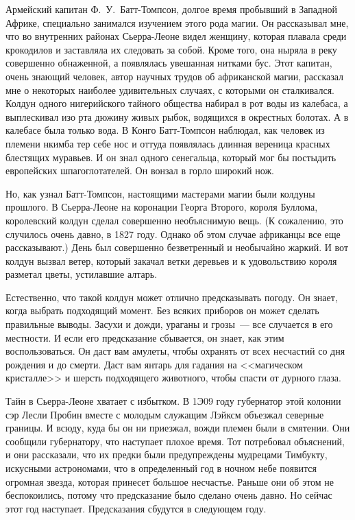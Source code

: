 \documentclass[12pt,a4paper,twoside,openany,svgnames]{memoir}
\begin{document}
Армейский капитан Ф.~У.~Батт-Томпсон, долгое время пробывший в Западной Африке, специально занимался изучением этого рода магии. Он рассказывал мне, что во внутренних районах Сьерра-Леоне видел женщину, которая плавала среди крокодилов и заставляла их следовать за собой. Кроме того, она ныряла в реку совершенно обнаженной, а появлялась увешанная нитками бус. Этот капитан, очень знающий человек, автор научных трудов об африканской магии, рассказал мне о некоторых наиболее удивительных случаях, с которыми он сталкивался. Колдун одного нигерийского тайного общества набирал в рот воды из калебаса, а выплескивал изо рта дюжину живых рыбок, водящихся в окрестных болотах. А в калебасе была только вода. В Конго Батт-Томпсон наблюдал, как человек из племени нкимба тер себе нос и оттуда появлялась длинная вереница красных блестящих муравьев. И он знал одного сенегальца, который мог бы постыдить европейских шпагоглотателей. Он вонзал в горло широкий нож.

Но, как узнал Батт-Томпсон, настоящими мастерами магии были колдуны прошлого. В Сьерра-Леоне на коронации Георга Второго, короля Буллома, королевский колдун сделал совершенно необъяснимую вещь. (К сожалению, это случилось очень давно, в 1827 году. Однако об этом случае африканцы все еще рассказывают.) День был совершенно безветренный и необычайно жаркий. И вот колдун вызвал ветер, который закачал ветки деревьев и к удовольствию короля разметал цветы, устилавшие алтарь.

Естественно, что такой колдун может отлично предсказывать погоду. Он знает, когда выбрать подходящий момент. Без всяких приборов он может сделать правильные выводы. Засухи и дожди, ураганы и грозы~--- все случается в его местности. И если его предсказание сбывается, он знает, как этим воспользоваться. Он даст вам амулеты, чтобы охранять от всех несчастий со дня рождения и до смерти. Даст вам янтарь для гадания на <<магическом кристалле>> и шерсть подходящего животного, чтобы спасти от дурного глаза.

Тайн в Сьерра-Леоне хватает с избытком. В 1Э09 году губернатор этой колонии сэр Лесли Пробин вместе с молодым служащим Лэйксм объезжал северные границы. И всюду, куда бы он ни приезжал, вожди племен были в смятении. Они сообщили губернатору, что наступает плохое время. Тот потребовал объяснений, и они рассказали, что их предки были предупреждены мудрецами Тимбукту, искусными астрономами, что в определенный год в ночном небе появится огромная звезда, которая принесет большое несчастье. Раньше они об этом не беспокоились, потому что предсказание было сделано очень давно. Но сейчас этот год наступает. Предсказания сбудутся в следующем году.
\end{document}
